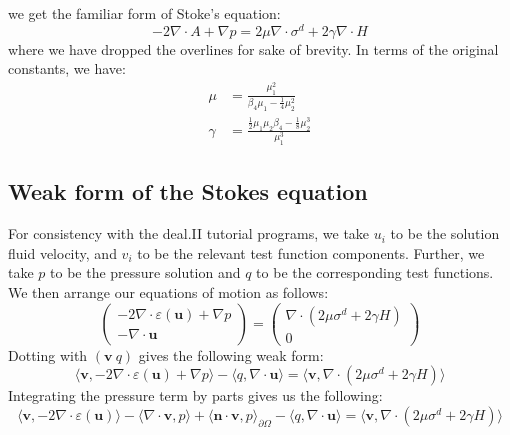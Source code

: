 \documentclass[reqno]{article}
\begin{document}
  we get the familiar form of Stoke's equation:
  \begin{equation}
    - 2\nabla \cdot A
    + \nabla p
    =
    2 \mu \nabla \cdot \sigma^d
    + 2 \gamma \nabla \cdot H
  \end{equation}
  where we have dropped the overlines for sake of brevity.
  In terms of the original constants, we have:
  \begin{equation}
    \begin{split}
      \mu
      &=
      \frac{\mu_1^2}{\beta_4 \mu_1 - \frac14 \mu_2^2} \\
      \gamma
      &=
      \frac{\frac12 \mu_1 \mu_2 \beta_4 - \frac18 \mu_2^3}{\mu_1^3}
    \end{split}
  \end{equation}

  \subsection{Weak form of the Stokes equation}
  For consistency with the deal.II tutorial programs, we take $u_i$ to be the
  solution fluid velocity, and $v_i$ to be the relevant test function
  components.
  Further, we take $p$ to be the pressure solution and $q$ to be the
  corresponding test functions.
  We then arrange our equations of motion as follows:
  \begin{equation}
    \begin{pmatrix}
      -2 \nabla \cdot \varepsilon(\mathbf{u}) + \nabla p\\
      - \nabla \cdot \mathbf{u}
    \end{pmatrix}
    =
    \begin{pmatrix}
      \nabla \cdot (2 \mu \sigma^d + 2 \gamma H) \\
      0
    \end{pmatrix}
  \end{equation}
  Dotting with $(\mathbf{v} \: q)$ gives the following weak form:
  \begin{equation}
    \langle \mathbf{v}, -2 \nabla \cdot \varepsilon(\mathbf{u}) + \nabla p \rangle
    - \langle q, \nabla \cdot \mathbf{u} \rangle
    =
    \langle \mathbf{v}, \nabla \cdot (2 \mu \sigma^d + 2 \gamma H) \rangle
  \end{equation}
  Integrating the pressure term by parts gives us the following:
  \begin{equation}
    \langle \mathbf{v}, -2 \nabla \cdot \varepsilon(\mathbf{u}) \rangle
    - \langle \nabla \cdot \mathbf{v}, p \rangle
    + \langle \mathbf{n} \cdot \mathbf{v}, p \rangle_{\partial \Omega}
    - \langle q, \nabla \cdot \mathbf{u} \rangle
    =
    \langle \mathbf{v}, \nabla \cdot (2 \mu \sigma^d + 2 \gamma H) \rangle
  \end{equation}
\end{document}
